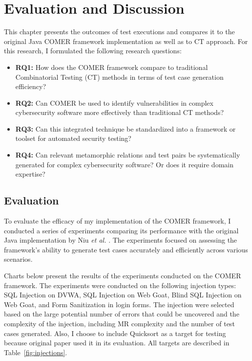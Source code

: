 
\chapter{Evaluation and Discussion}
\label{ch:eval}

This chapter presents the outcomes of test executions and compares it to the original Java COMER framework implementation as well as to CT approach. For this research, I formulated the following research questions:

\begin{itemize}
  \item \textbf{RQ1:} How does the COMER framework compare to traditional Combinatorial Testing (CT) methods in terms of test case generation efficiency?
  \item \textbf{RQ2:} Can COMER be used to identify vulnerabilities in complex cybersecurity software more effectively than traditional CT methods?
  \item \textbf{RQ3:} Can this integrated technique be standardized into a framework or toolset for automated security testing?
  \item \textbf{RQ4:} Can relevant metamorphic relations and test pairs be systematically generated for complex cybersecurity software? Or does it require domain expertise?
\end{itemize}

\section{Evaluation}
\label{sec:evaluation}

To evaluate the efficacy of my implementation of the COMER framework, I conducted a series of experiments comparing its performance with the original Java implementation by Niu \textit{et al.} \cite{comer}.
The experiments focused on assessing the framework's ability to generate test cases accurately and efficiently across various scenarios.

Charts below present the results of the experiments conducted on the COMER framework. The experiments were conducted on the following injection types: SQL Injection on DVWA, SQL Injection on Web Goat, Blind SQL Injection on  Web Goat, and Form Sanitization in login forms. The injection were selected based on the large potential number of errors that could be uncovered and the complexity of the injection, including MR complexity and the number of test cases generated. Also, I choose to include Quicksort as a target for testing because original paper used it in its evaluation. All targets are described in Table~\ref{fig:injections}.

